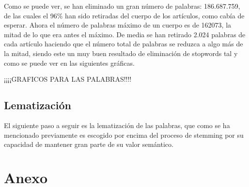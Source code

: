 \documentclass[10pt, a4paper]{article}
\begin{document}
Como se puede ver, se han eliminado un gran número de palabras: 186.687.759, de las cuales el 96\% han sido retiradas del cuerpo de los artículos, como cabía de esperar. Ahora el número de palabras máximo de un cuerpo es de 162073, la mitad de lo que era antes el máximo. De media se han retirado 2.024 palabras de cada artículo haciendo que el número total de palabras se reduzca a algo más de la mitad, siendo este un muy buen resultado de eliminación de stopwords tal y como se puede ver en las siguientes gráficas.

¡¡¡¡GRAFICOS PARA LAS PALABRAS!!!!


\subsection{Lematización}

El siguiente paso a seguir es la lematización de las palabras, que como se ha mencionado previamente es escogido por encima del proceso de stemming por su capacidad de mantener gran parte de su valor semántico. 



\clearpage

\section{Anexo}

\renewcommand{\listalgorithmcfname}{\subsection{\textbf{Algoritmos}}}
\listofalgorithms

\renewcommand{\listtablename}{\subsection{\textbf{Tablas}}}
\listoftables

\renewcommand{\listfigurename}{\subsection{\textbf{Imágenes y figuras}}}
\listoffigures
\end{document}
